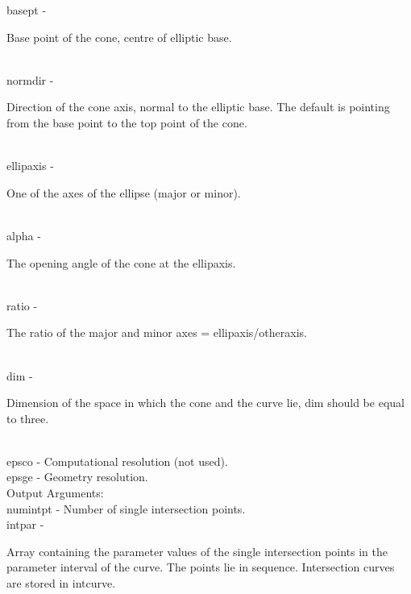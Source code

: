         \>\>    {\fov basept}\> - \>    \begin{minipg2}
                                Base point of the cone, centre of elliptic base.
                                \end{minipg2}\\
        \>\>    {\fov normdir}\> - \>   \begin{minipg2}
                                Direction of the cone axis, normal to the elliptic base. The default is pointing from the base point to the top point of the cone.
                                \end{minipg2}\\
        \>\>    {\fov ellipaxis}\> - \> \begin{minipg2}
                                One of the axes of the ellipse (major or minor).
                                \end{minipg2}\\
        \>\>    {\fov alpha}\> - \>     \begin{minipg2}
                                The opening angle of the cone at the ellipaxis.
                                \end{minipg2}\\
        \>\>    {\fov ratio}\> - \>     \begin{minipg2}
                                The ratio of the major and minor
                                axes = ellipaxis/otheraxis.
                                \end{minipg2}\\[0.3ex]
        \>\>    {\fov dim}      \> - \> \begin{minipg2}
                                Dimension of the space in which the
                                cone and the curve
                                lie, dim should be equal to three.
                                \end{minipg2}\\[0.3ex]
        \>\>    {\fov epsco}    \> - \> Computational resolution (not used).\\
        \>\>    {\fov epsge}    \> - \> Geometry resolution.\\
\newpagetabs
        \>Output Arguments:\\
        \>\>    {\fov numintpt}\> - \>  Number of single intersection points.\\
        \>\>    {\fov intpar}   \> - \> \begin{minipg2}
                        Array containing the parameter values of the
                        single intersection points in the parameter
                        interval of the curve. The points lie in sequence.
                        Intersection curves are stored in intcurve.
                                \end{minipg2}\\[0.8ex]
